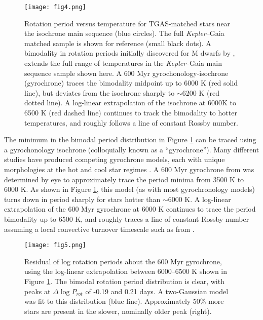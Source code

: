 \documentclass[manuscript, letterpaper]{aastex6}
\newcommand{\Kepler}{\textsl{Kepler}\xspace}
\begin{document}
\begin{figure}[]
\centering
\texttt{[image: fig4.png]}
\caption{ Rotation period versus temperature for TGAS-matched stars near the isochrone main sequence (blue circles). 
The full \Kepler--Gaia matched sample is shown for reference (small black dots). A bimodality in rotation periods initially discovered for M dwarfs by \citet{mcquillan2013}, extends the full range of temperatures in the \Kepler--Gaia main sequence sample shown here.
A \citet{meibom2011} 600 Myr gyrochonology-isochrone (gyrochrone) traces the bimodality midpoint up to 6000 K (red solid line), but deviates from the isochrone sharply to $\sim$6200 K (red dotted line). A log-linear extrapolation of the isochrone at 6000K to 6500 K (red dashed line) continues to track the bimodality to hotter temperatures, and roughly follows a line of constant Rossby number. 
}
\label{fig:gyro}
\end{figure}



The minimum in the bimodal period distribution in Figure \ref{fig:gyro} can be traced using a gyrochonology isochrone (colloquially known as a ``gyrochrone'').  Many different studies have produced competing gyrochrone models, each with unique morphologies at the hot and cool star regimes \citep[e.g.][]{barnes2007,mamajek2008,meibom2011,angus2015}. A 600 Myr gyrochrone from \citet{meibom2011} was determined by eye to approximately trace the period minima from 3500 K to 6000 K. As shown in Figure \ref{fig:gyro}, this model (as with most gyrochronology models) turns down in period sharply for stars hotter than $\sim$6000 K. A log-linear extrapolation of the 600 Myr gyrochrone at 6000 K continues to trace the period bimodality up to 6500 K, and roughly traces a line of constant Rossby number assuming a local convective turnover timescale such as from \citet{barnes_kim2010}. 



\begin{figure}[]
\centering
\texttt{[image: fig5.png]}
\caption{Residual of log rotation periods about the \citet{meibom2011} 600 Myr gyrochrone, using the log-linear extrapolation between 6000--6500 K shown in Figure \ref{fig:gyro}. The bimodal rotation period distribution is clear, with peaks at $\Delta \log P_{rot}$ of -0.19 and 0.21 days. A two-Gaussian model was fit to this distribution (blue line).
Approximately 50\% more stars are present in the slower, nominally older peak (right).}
\label{fig:diff}
\end{figure}
\end{document}
